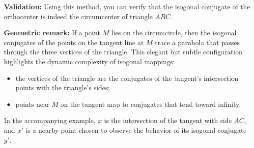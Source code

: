 \medskip
\noindent
\textbf{Validation:} Using this method, you can verify that the isogonal conjugate of the orthocenter is indeed the circumcenter of triangle $ABC$.

\medskip
\noindent
\textbf{Geometric remark:} If a point $M$ lies on the circumcircle, then the isogonal conjugates of the points on the tangent line at $M$ trace a parabola that passes through the three vertices of the triangle. This elegant but subtle configuration highlights the dynamic complexity of isogonal mappings:
\begin{itemize}
  \item the vertices of the triangle are the conjugates of the tangent's intersection points with the triangle’s sides;
  \item points near $M$ on the tangent map to conjugates that tend toward infinity.
\end{itemize}

\medskip
\noindent
In the accompanying example, $x$ is the intersection of the tangent with side $AC$, and $x'$ is a nearby point chosen to observe the behavior of its isogonal conjugate $y'$.

\vspace{1em}

 \begin{tkzexample}[latex = 6cm]
\begin{center}
\end{center}
 \end{tkzexample}

